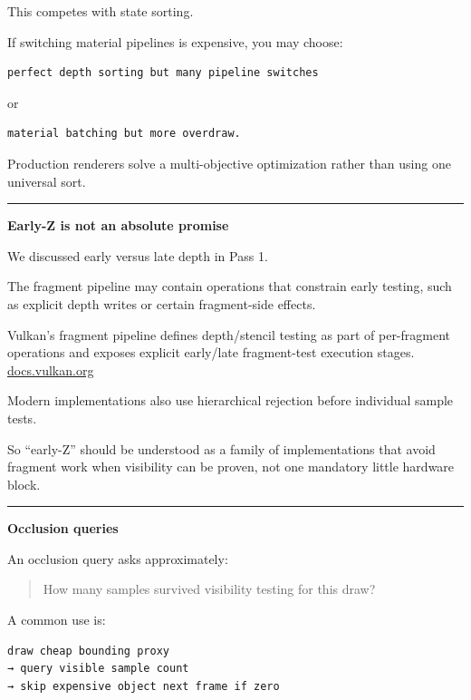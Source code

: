 This competes with state sorting.

If switching material pipelines is expensive, you may choose:

\begin{verbatim}
perfect depth sorting but many pipeline switches
\end{verbatim}

or

\begin{verbatim}
material batching but more overdraw.
\end{verbatim}

Production renderers solve a multi-objective optimization rather than using one universal sort.

\begin{center}\rule{0.5\linewidth}{0.5pt}\end{center}

\textbf{Early-Z is not an absolute promise}

We discussed early versus late depth in Pass 1.

The fragment pipeline may contain operations that constrain early testing, such as explicit depth writes or certain fragment-side effects.

Vulkan's fragment pipeline defines depth/stencil testing as part of per-fragment operations and exposes explicit early/late fragment-test execution stages. \href{https://docs.vulkan.org/spec/latest/chapters/fragops.html?utm_source=chatgpt.com}{docs.vulkan.org}

Modern implementations also use hierarchical rejection before individual sample tests.

So ``early-Z'' should be understood as a family of implementations that avoid fragment work when visibility can be proven, not one mandatory little hardware block.

\begin{center}\rule{0.5\linewidth}{0.5pt}\end{center}

\textbf{Occlusion queries}

An occlusion query asks approximately:

\begin{quote}
How many samples survived visibility testing for this draw?
\end{quote}

A common use is:

\begin{verbatim}
draw cheap bounding proxy
→ query visible sample count
→ skip expensive object next frame if zero
\end{verbatim}

